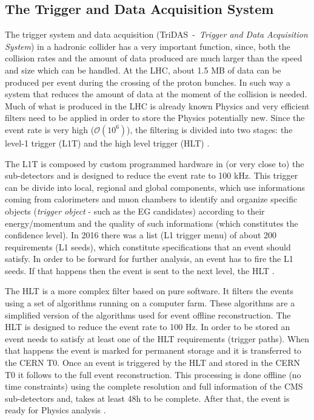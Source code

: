 \subsection{The Trigger and Data Acquisition System}
The trigger system and data acquisition (TriDAS~-~\textit{Trigger and Data Acquisition System}) in a hadronic collider has a very important function, since, both the collision rates and the amount of data produced are much larger than the speed and size which can be handled. At the LHC, about 1.5 MB of data can be produced per event during the crossing of the proton bunches. In such way a system that reduces the amount of data at the moment of the collision is needed. Much of what is produced in the LHC is already known Physics and very efficient filters need to be applied in order to store the Physics potentially new. Since the event rate is very high ($\mathcal{O}(10^{6})$), the filtering is divided into two stages: the level-1 trigger (L1T) and the high level trigger (HLT) \cite{bib:JINST-3-362-2008,bib:CMS-DAS-TDR-2002}. 

The L1T is composed by custom programmed hardware in (or very close to) the sub-detectors and is designed to reduce the event rate to 100 kHz. This trigger can be divide into local, regional and global components, which use informations coming from calorimeters and muon chambers to identify and organize specific objects (\textit{trigger object} - such as the EG candidates) according to their energy/momentum and the quality of such informations (which constitutes the confidence level). In 2016 there was a list (L1 trigger menu) of about 200 requirements (L1 seeds), which constitute specifications that an event should satisfy. In order to be forward for further analysis, an event has to fire the L1 seeds. If that happens then the event is sent to the next level, the HLT \cite{bib:JINST-3-362-2008,bib:CMS-DAS-TDR-2002}.

The HLT is a more complex filter based on pure software. It filters the events using a set of algorithms running on a computer farm. These algorithms are a simplified version of the algorithms used for event offline reconstruction. The HLT is designed to reduce the event rate to 100 Hz. In order to be stored an event needs to satisfy at least one of the HLT requirements (trigger paths). When that happens the event is marked for permanent storage and it is transferred to the CERN T0. Once an event is triggered by the HLT and stored in the CERN T0 it follows to the full event reconstruction. This processing is done offline (no time constraints) using the complete resolution and full information of the CMS sub-detectors and, takes at least 48h to be complete. After that, the event is ready for Physics analysis \cite{bib:JINST-3-362-2008,bib:CMS-DAS-TDR-2002}.